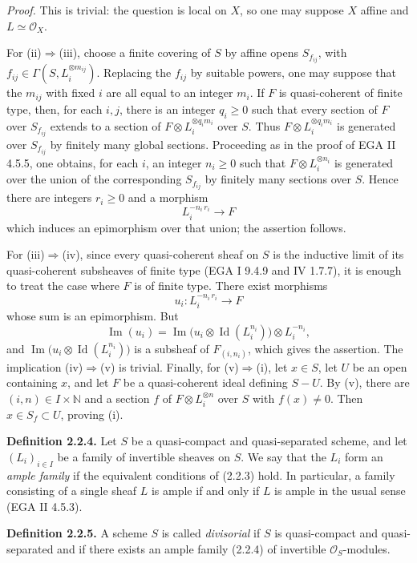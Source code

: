\emph{Proof.} This is trivial: the question is local on $X$, so one may suppose $X$ affine and $L\simeq\mathcal O_X$.

For (ii)$\Rightarrow$(iii), choose a finite covering of $S$ by affine opens $S_{f_{ij}}$, with $f_{ij}\in\Gamma(S,L_i^{\otimes m_{ij}})$. Replacing the $f_{ij}$ by suitable powers, one may suppose that the $m_{ij}$ with fixed $i$ are all equal to an integer $m_i$. If $F$ is quasi-coherent of finite type, then, for each $i,j$, there is an integer $q_i\ge0$ such that every section of $F$ over $S_{f_{ij}}$ extends to a section of $F\otimes L_i^{\otimes q_im_i}$ over $S$. Thus $F\otimes L_i^{\otimes q_im_i}$ is generated over $S_{f_{ij}}$ by finitely many global sections. Proceeding as in the proof of EGA II 4.5.5, one obtains, for each $i$, an integer $n_i\ge0$ such that $F\otimes L_i^{\otimes n_i}$ is generated over the union of the corresponding $S_{f_{ij}}$ by finitely many sections over $S$. Hence there are integers $r_i\ge0$ and a morphism
\[
L_i^{-n_i\, r_i}\longrightarrow F
\]
which induces an epimorphism over that union; the assertion follows.

For (iii)$\Rightarrow$(iv), since every quasi-coherent sheaf on $S$ is the inductive limit of its quasi-coherent subsheaves of finite type (EGA I 9.4.9 and IV 1.7.7), it is enough to treat the case where $F$ is of finite type. There exist morphisms
\[
u_i:L_i^{-n_i\, r_i}\longrightarrow F
\]
whose sum is an epimorphism. But
\[
\operatorname{Im}(u_i)=\operatorname{Im}\bigl(u_i\otimes\operatorname{Id}(L_i^{n_i})\bigr)\otimes L_i^{-n_i},
\]
and $\operatorname{Im}\bigl(u_i\otimes\operatorname{Id}(L_i^{n_i})\bigr)$ is a subsheaf of $F_{(i,n_i)}$, which gives the assertion. The implication (iv)$\Rightarrow$(v) is trivial. Finally, for (v)$\Rightarrow$(i), let $x\in S$, let $U$ be an open containing $x$, and let $F$ be a quasi-coherent ideal defining $S-U$. By (v), there are $(i,n)\in I\times\mathbb N$ and a section $f$ of $F\otimes L_i^{\otimes n}$ over $S$ with $f(x)\ne0$. Then $x\in S_f\subset U$, proving (i).

\textbf{Definition 2.2.4.} Let $S$ be a quasi-compact and quasi-separated scheme, and let $(L_i)_{i\in I}$ be a family of invertible sheaves on $S$. We say that the $L_i$ form an \emph{ample family} if the equivalent conditions of (2.2.3) hold. In particular, a family consisting of a single sheaf $L$ is ample if and only if $L$ is ample in the usual sense (EGA II 4.5.3).

\textbf{Definition 2.2.5.} A scheme $S$ is called \emph{divisorial} if $S$ is quasi-compact and quasi-separated and if there exists an ample family (2.2.4) of invertible $\mathcal O_S$-modules.


